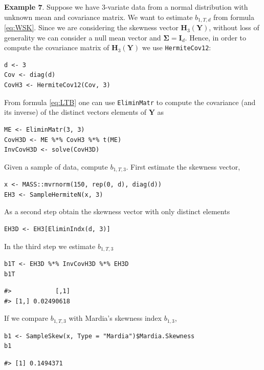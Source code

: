 \textbf{Example 7}. Suppose we have \(3\)-variate data from a normal distribution with unknown mean and covariance matrix. We want to estimate \(b_{1,T,d}\) from formula \eqref{eq:WSK}. Since we are considering the skewness vector \(\mathbf{H}_3(\mathbf{Y})\), without loss of generality we can consider a null mean vector and \(\boldsymbol{\Sigma}= \mathbf{I}_d\). Hence, in order to compute the covariance matrix of \(\mathbf{H}_3(\mathbf{Y})\) we use \texttt{HermiteCov12}:

\begin{verbatim}
d <- 3
Cov <- diag(d)
CovH3 <- HermiteCov12(Cov, 3)
\end{verbatim}

From formula \eqref{eq:LTB} one can use \texttt{EliminMatr} to compute the covariance (and its inverse) of the distinct vectors elements of \(\mathbf{Y}\) as

\begin{verbatim}
ME <- EliminMatr(3, 3)
CovH3D <- ME %*% CovH3 %*% t(ME)
InvCovH3D <- solve(CovH3D)
\end{verbatim}

Given a sample of data, compute \(b_{1,T,3}\). First estimate the skewness vector,

\begin{verbatim}
x <- MASS::mvrnorm(150, rep(0, d), diag(d))
EH3 <- SampleHermiteN(x, 3)
\end{verbatim}

As a second step obtain the skewness vector with only distinct elements

\begin{verbatim}
EH3D <- EH3[EliminIndx(d, 3)]
\end{verbatim}

In the third step we estimate \(b_{1,T,3}\)

\begin{verbatim}
b1T <- EH3D %*% InvCovH3D %*% EH3D
b1T
\end{verbatim}

\begin{verbatim}
#>            [,1]
#> [1,] 0.02490618
\end{verbatim}

If we compare \(b_{1,T,3}\) with Mardia's skewness index \(b_{1,3}\),

\begin{verbatim}
b1 <- SampleSkew(x, Type = "Mardia")$Mardia.Skewness
b1
\end{verbatim}

\begin{verbatim}
#> [1] 0.1494371
\end{verbatim}

